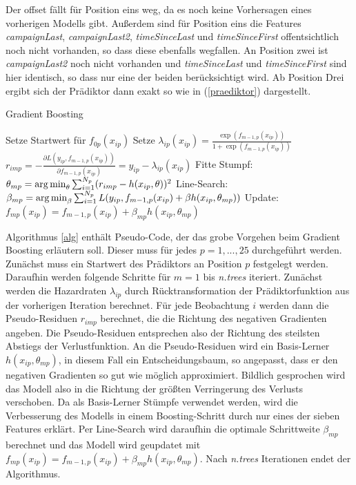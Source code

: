 Der offset fällt für Position eins weg, da es noch keine Vorhersagen eines vorherigen Modells gibt. Außerdem sind für Position eins die Features \textit{campaignLast}, \textit{campaignLast2}, \textit{timeSinceLast} und \textit{timeSinceFirst} offentsichtlich noch nicht vorhanden, so dass diese ebenfalls wegfallen. An Position zwei ist \textit{campaignLast2} noch nicht vorhanden und \textit{timeSinceLast} und \textit{timeSinceFirst} sind hier identisch, so dass nur eine der beiden berücksichtigt wird. Ab Position Drei ergibt sich der Prädiktor dann exakt so wie in (\ref{praediktor}) dargestellt.\\
\begin{algorithm}
\caption{Gradient Boosting}\label{alg}
\label{gradboosting}
\begin{algorithmic}
\STATE Setze Startwert für $f_{0p}(x_{ip})$
	\STATE Setze $\lambda_{ip}(x_{ip}) = \frac{\exp(f_{m-1,p}(x_{ip}))}{1+\exp(f_{m-1,p}(x_{ip}))}$
		\STATE $r_{imp} = - \frac{\partial L(y_{ip},f_{m-1,p}(x_{ip}))}{\partial f_{m-1,p}(x_{ip})} = y_{ip} - \lambda_{ip}(x_{ip})$
	\ENDFOR
	\STATE Fitte Stumpf: $\theta_{mp} = \operatorname*{arg\,min}_{\theta} \sum_{i=1}^{N_p} (r_{imp} - h(x_{ip}, \theta))^2$
	\STATE Line-Search: $\beta_{mp} = \operatorname*{arg\,min}_{\beta} \sum_{i=1}^{N_p} L(y_{ip}, f_{m-1,p}(x_{ip}) + \beta h(x_{ip},\theta_{mp}))$
	\STATE Update: $f_{mp}(x_{ip}) = f_{m-1,p}(x_{ip}) + \beta_{mp} h(x_{ip},\theta_{mp})$
\ENDFOR
\end{algorithmic}
\end{algorithm}
Algorithmus \ref{alg} enthält Pseudo-Code, der das grobe Vorgehen beim Gradient Boosting erläutern soll. Dieser muss für jedes $p=1,...,25$ durchgeführt werden. Zunächst muss ein Startwert des Prädiktors an Position $p$ festgelegt werden. Daraufhin werden folgende Schritte für $m=1$ bis \textit{n.trees} iteriert. Zunächst werden die Hazardraten $\lambda_{ip}$ durch Rücktransformation der Prädiktorfunktion aus der vorherigen Iteration berechnet. Für jede Beobachtung $i$ werden dann die Pseudo-Residuen $r_{imp}$ berechnet, die die Richtung des negativen Gradienten angeben. Die Pseudo-Residuen entsprechen also der Richtung des steilsten Abstiegs der Verlustfunktion. An die Pseudo-Residuen wird ein Basis-Lerner $h(x_{ip},\theta_{mp})$, in diesem Fall ein Entscheidungsbaum, so angepasst, dass er den negativen Gradienten so gut wie möglich approximiert. Bildlich gesprochen wird das Modell also in die Richtung der größten Verringerung des Verlusts verschoben. Da als Basis-Lerner Stümpfe verwendet werden, wird die Verbesserung des Modells in einem Boosting-Schritt durch nur eines der sieben Features erklärt. Per Line-Search wird daraufhin die optimale Schrittweite $\beta_{mp}$ berechnet und das Modell wird geupdatet mit $f_{mp}(x_{ip}) = f_{m-1,p}(x_{ip}) + \beta_{mp} h(x_{ip},\theta_{mp})$. Nach \textit{n.trees} Iterationen endet der Algorithmus.\\

